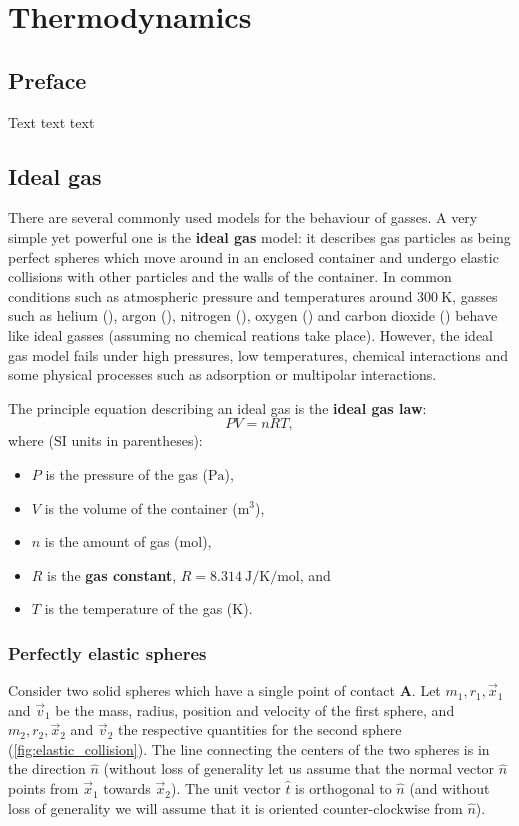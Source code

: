 \chapter{Thermodynamics}

\section{Preface}
Text text text

\section{Ideal gas}
There are several commonly used models for the behaviour of gasses. A very simple yet powerful one is the \textbf{ideal gas} model: it describes gas particles as being perfect spheres which move around in an enclosed container and undergo elastic collisions with other particles and the walls of the container. In common conditions such as atmospheric pressure and temperatures around $\SI{300}{\kelvin}$, gasses such as helium (), argon (), nitrogen (), oxygen () and carbon dioxide () behave like ideal gasses (assuming no chemical reations take place). However, the ideal gas model fails under high pressures, low temperatures, chemical interactions and some physical processes such as adsorption or multipolar interactions.

The principle equation describing an ideal gas is the \textbf{ideal gas law}:
\begin{equation}
	PV = nRT,
	\label{eq:ideal_gas_law}
\end{equation}
where (SI units in parentheses):
\begin{itemize}
	\item $P$ is the pressure of the gas ($\si{\pascal}$),
	\item $V$ is the volume of the container ($\si{\cubic\metre}$),
	\item $n$ is the amount of gas ($\si{\mol}$),
	\item $R$ is the \textbf{gas constant}, $R=\SI{8.314}{\joule\per\kelvin\per\mol}$, and
	\item $T$ is the temperature of the gas ($\si{\kelvin}$).
\end{itemize}

\subsection{Perfectly elastic spheres}
Consider two solid spheres which have a single point of contact $\bm{A}$. Let $m_{1}, r_{1}, \vec{x}_{1}$ and $\vec{v}_{1}$ be the mass, radius, position and velocity of the first sphere, and $m_{2}, r_{2}, \vec{x}_{2}$ and $\vec{v}_{2}$ the respective quantities for the second sphere (\autoref{fig:elastic_collision}). The line connecting the centers of the two spheres is in the direction $\hat{n}$ (without loss of generality let us assume that the normal vector $\hat{n}$ points from $\vec{x}_{1}$ towards $\vec{x}_{2}$). The unit vector $\hat{t}$ is orthogonal to $\hat{n}$ (and without loss of generality we will assume that it is oriented counter-clockwise from $\hat{n}$).

